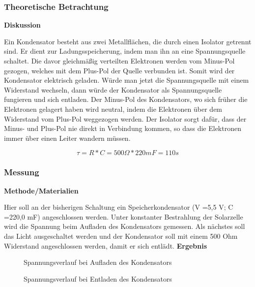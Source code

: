\documentclass{etit-workshop-protokoll}
\begin{document}
    \subsubsection{Theoretische Betrachtung}                            %
        \textbf{Diskussion}
        \newline
        \par Ein Kondensator besteht aus zwei Metallflächen, die durch einen Isolator getrennt sind. Er dient zur Ladungsspeicherung, indem man ihn an eine Spannungsquelle schaltet. Die davor gleichmäßig verteilten Elektronen werden vom Minus-Pol gezogen, welches mit dem Plus-Pol der Quelle verbunden ist. Somit wird der Kondensator elektrisch geladen. Würde man jetzt die Spannungsquelle mit einem Widerstand wechseln, dann würde der Kondensator als Spannungsquelle fungieren und sich entladen. Der Minus-Pol des Kondensators, wo sich früher die Elektronen gelagert haben wird neutral, indem die Elektronen über dem Widerstand vom Plus-Pol weggezogen werden. Der Isolator sorgt dafür, dass der Minus- und Plus-Pol nie direkt in Verbindung kommen, so dass die Elektronen immer über einen Leiter wandern müssen.
        
        $$
            \tau = R * C = 500 \Omega * 220mF = 110s
        $$
        
    \subsubsection{Messung}                                             %
        \textbf{Methode/Materialien}
        \newline
        \par Hier soll an der bisherigen Schaltung ein Speicherkondensator (V =5,5 V; C =220,0 mF) angeschlossen
        werden. Unter konstanter Bestrahlung der Solarzelle wird die Spannung beim Aufladen des
        Kondensators gemessen. Als nächstes soll das Licht ausgeschaltet werden und der Kondensator soll mit
        einem 500 Ohm Widerstand angeschlossen werden, damit er sich entlädt.
        \vspace{4mm}
        \newline
        \textbf{Ergebnis}
        \newline
        \par
        \begin{figure}[H]
            \def\svgwidth{\textwidth}
            
            
            \caption{Spannungsverlauf bei Aufladen des Kondensators}
        \end{figure}
        \begin{figure}[H]
            \def\svgwidth{\textwidth}
            
            
            \caption{Spannungsverlauf bei Entladen des Kondensators}
        \end{figure}
\end{document}

